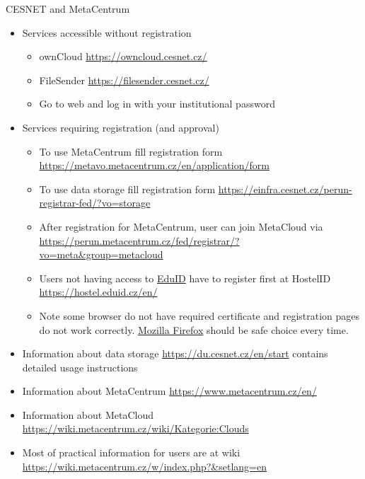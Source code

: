 \documentclass[compress, ucs, xelatex, 11pt, xcolor=svgnames,
  hyperref={
    bookmarks=true,
    unicode=true,
    colorlinks=true,
    pdftitle={Linux, command line and MetaCentrum},
    plainpages=false,
    pdfauthor={Vojtech Zeisek},
    pdfsubject={Course about use of Linux command line, writing shell scripts and using MetaCentrum of CESNET},
    pdfcreator={XeLaTeX},
    pdfkeywords={Linux, GNU, BASH, shell, command line, MetaCentrum},
    linkcolor=DarkRed,
    anchorcolor=DarkBlue,
    citecolor=Indigo,
    filecolor=NavyBlue,
    menucolor=DarkMagenta,
    urlcolor=DarkBlue,
    pdftex},
  url={hyphens, lowtilde} %
  ]{beamer}
\begin{document}
\begin{frame}[allowframebreaks]{CESNET and MetaCentrum}
\begin{itemize}
\begin{itemize}
    \end{itemize}
    \item Services accessible without registration
    \begin{itemize}
      \item ownCloud \url{https://owncloud.cesnet.cz/}
      \item FileSender \url{https://filesender.cesnet.cz/}
      \item Go to web and log in with your institutional password
    \end{itemize}
    \item Services requiring registration (and approval)
    \begin{itemize}
      \item To use MetaCentrum fill registration form \url{https://metavo.metacentrum.cz/en/application/form}
      \item To use data storage fill registration form \url{https://einfra.cesnet.cz/perun-registrar-fed/?vo=storage}
      \item After registration for MetaCentrum, user can join MetaCloud via \url{https://perun.metacentrum.cz/fed/registrar/?vo=meta&group=metacloud}
      \item Users not having access to \href{https://www.eduid.cz/en/index}{EduID} have to register first at HostelID \url{https://hostel.eduid.cz/en/}
      \item Note some browser do not have required certificate and registration pages do not work correctly. \href{https://www.mozilla.org/firefox/}{Mozilla Firefox} should be safe choice every time.
    \end{itemize}
    \item Information about data storage \url{https://du.cesnet.cz/en/start} contains detailed usage instructions
    \item Information about MetaCentrum \url{https://www.metacentrum.cz/en/}
    \item Information about MetaCloud \url{https://wiki.metacentrum.cz/wiki/Kategorie:Clouds}
    \item Most of practical information for users are at wiki \url{https://wiki.metacentrum.cz/w/index.php?&setlang=en}
  \end{itemize}
\end{frame}
\end{document}
